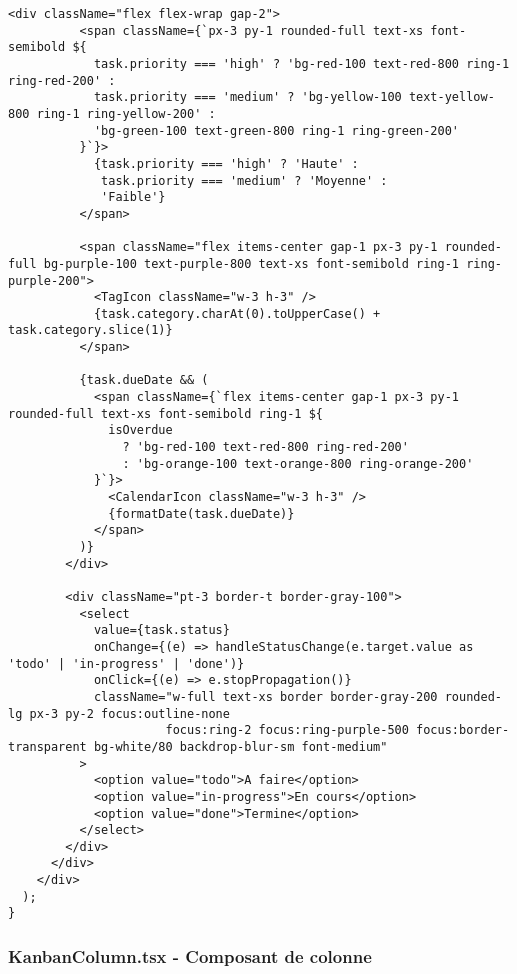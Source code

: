 \documentclass[12pt,a4paper]{article}
\begin{document}
\begin{lstlisting}[caption=KanbanCard.tsx - Carte de tache avec drag-and-drop (Tomas)]
        <div className="flex flex-wrap gap-2">
          <span className={`px-3 py-1 rounded-full text-xs font-semibold ${
            task.priority === 'high' ? 'bg-red-100 text-red-800 ring-1 ring-red-200' :
            task.priority === 'medium' ? 'bg-yellow-100 text-yellow-800 ring-1 ring-yellow-200' :
            'bg-green-100 text-green-800 ring-1 ring-green-200'
          }`}>
            {task.priority === 'high' ? 'Haute' :
             task.priority === 'medium' ? 'Moyenne' :
             'Faible'}
          </span>
          
          <span className="flex items-center gap-1 px-3 py-1 rounded-full bg-purple-100 text-purple-800 text-xs font-semibold ring-1 ring-purple-200">
            <TagIcon className="w-3 h-3" />
            {task.category.charAt(0).toUpperCase() + task.category.slice(1)}
          </span>
          
          {task.dueDate && (
            <span className={`flex items-center gap-1 px-3 py-1 rounded-full text-xs font-semibold ring-1 ${
              isOverdue 
                ? 'bg-red-100 text-red-800 ring-red-200' 
                : 'bg-orange-100 text-orange-800 ring-orange-200'
            }`}>
              <CalendarIcon className="w-3 h-3" />
              {formatDate(task.dueDate)}
            </span>
          )}
        </div>

        <div className="pt-3 border-t border-gray-100">
          <select
            value={task.status}
            onChange={(e) => handleStatusChange(e.target.value as 'todo' | 'in-progress' | 'done')}
            onClick={(e) => e.stopPropagation()}
            className="w-full text-xs border border-gray-200 rounded-lg px-3 py-2 focus:outline-none 
                      focus:ring-2 focus:ring-purple-500 focus:border-transparent bg-white/80 backdrop-blur-sm font-medium"
          >
            <option value="todo">A faire</option>
            <option value="in-progress">En cours</option>
            <option value="done">Termine</option>
          </select>
        </div>
      </div>
    </div>
  );
}
\end{lstlisting}

\subsubsection{KanbanColumn.tsx - Composant de colonne}
\end{document}
